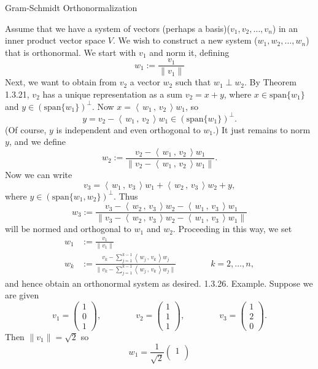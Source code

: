 \documentclass[smaller,hyperref={CJKbookmarks=true}]{beamer}
\newcommand{\myseries}[2]{$#1_1,#1_2,\dots,#1_#2$}
\newcommand{\scp}[2]{\left\langle\,#1\,,\,#2\,\right\rangle} \newcommand{\scpp}{\langle\,\cdot\,,\,\cdot\,\rangle}
\begin{document}
\begin{frame}{Gram-Schmidt Orthonormalization}
\begin{spacing}{0.9}
Assume that we have a system of vectors (perhaps a basis)(\myseries{v}{n}) in an inner product vector space $V$. We wish to construct a new system (\myseries{w}{n}) that is orthonormal. We start with $v_1$ and norm it, defining
\[w_1:=\frac{v_1}{\|v_1\|}\]
Next, we want to obtain from $v_2$ a vector $w_2$ such that $w_1\perp w_2$. By Theorem 1.3.21, $v_2$ has a unique representation as a sum $v_2=x+y$, where $x\in\text{span}\{w_1\}$ and $y\in(\text{span}\{w_1\})^{\perp}$. Now $x=\scp{w_1}{v_2}w_1$, so
\[y=v_2-\scp{w_1}{v_2}w_1\in(\text{span}\{w_1\})^{\perp}.\]
(Of course, $y$ is independent and even orthogonal to $w_1$.) It just remains to norm $y$, and we define
\[w_2:=\frac{v_2-\scp{w_1}{v_2}w_1}{\|v_2-\scp{w_1}{v_2}w_1\|}.\]
\newpage
Now we can write
\[v_3=\scp{w_1}{v_3}w_1+\scp{w_2}{v_3}w_2+y,\]
where $y\in(\text{span}\{w_1,w_2\})^{\perp}$. Thus
\[w_3:=\frac{v_3-\scp{w_2}{v_3}w_2-\scp{w_1}{v_3}w_1}{\|v_3-\scp{w_2}{v_3}w_2-\scp{w_1}{v_3}w_1\|}\]
will be normed and orthogonal to $w_1$ and $w_2$. Proceeding in this way, we set
\begin{align*}
  w_1 &:=\frac{v_1}{\|v_1\|} \\
  w_k &:=\frac{v_k-\sum_{j=1}^{k-1}\scp{w_j}{v_k}w_j}{\|v_k-\sum_{j=1}^{k-1}\scp{w_j}{v_k}w_j\|}\qquad\qquad k=2,\ldots,n,
\end{align*}
and hence obtain an orthonormal system as desired.
\newpage
\alert{1.3.26. Example.} Suppose we are given
\[v_1=\begin{pmatrix}
        1 \\
        0 \\
        1
      \end{pmatrix},\qquad\qquad v_2=\begin{pmatrix}
            1 \\
            1 \\
            1
          \end{pmatrix},\qquad\qquad v_3=\begin{pmatrix}
                1 \\
                2 \\
                0
              \end{pmatrix}.\]
Then $\|v_1\|=\sqrt{2}$ so
\[w_1=\frac{1}{\sqrt{2}}\begin{pmatrix}
                          1 \\

\end{pmatrix}\]
\end{spacing}
\end{frame}
\end{document}

